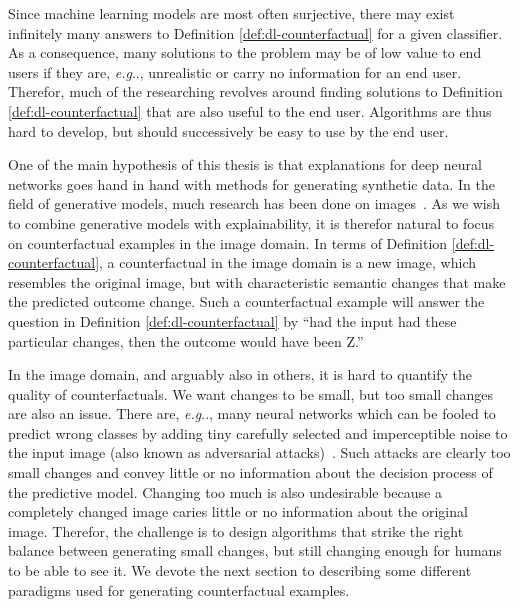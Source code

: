 \documentclass[11pt,a4paper,twoside,openright,final]{memoir}
\makeatletter
\DeclareRobustCommand\onedot{\futurelet\@let@token\@onedot}
\def\@onedot{\ifx\@let@token.\else.\null\fi\xspace}
\def\eg{\emph{e.g}\onedot} \def\Eg{\emph{E.g}\onedot}
\makeatother
\begin{document}
Since machine learning models are most often surjective, there may exist infinitely many answers to Definition \ref{def:dl-counterfactual} for a given classifier.
As a consequence, many solutions to the problem may be of low value to end users if they are, \eg, unrealistic or carry no information for an end user.
Therefor, much of the researching revolves around finding solutions to Definition \ref{def:dl-counterfactual} that are also useful to the end user.
Algorithms are thus hard to develop, but should successively be easy to use by the end user.

One of the main hypothesis of this thesis is that explanations for deep neural networks goes hand in hand with methods for generating synthetic data. 
In the field of generative models, much research has been done on images~\cite{realnvp, sngan, vae}.
As we wish to combine generative models with explainability, it is therefor natural to focus on counterfactual examples in the image domain.
In terms of Definition \ref{def:dl-counterfactual}, a counterfactual in the image domain is a new image, which resembles the original image, but with characteristic semantic changes that make the predicted outcome change.
Such a counterfactual example will answer the question in Definition \ref{def:dl-counterfactual} by ``had the input had these particular changes, then the outcome would have been Z.''

In the image domain, and arguably also in others, it is hard to quantify the quality of counterfactuals.
We want changes to be small, but too small changes are also an issue. 
There are, \eg, many neural networks which can be fooled to predict wrong classes by adding tiny carefully selected and imperceptible noise to the input image (also known as adversarial attacks)~\cite{su2019one}. 
Such attacks are clearly too small changes and convey little or no information about the decision process of the predictive model. 
Changing too much is also undesirable because a completely changed image caries little or no information about the original image.
Therefor, the challenge is to design algorithms that strike the right balance between generating small changes, but still changing enough for humans to be able to see it. 
We devote the next section to describing some different paradigms used for generating counterfactual examples.
\end{document}
